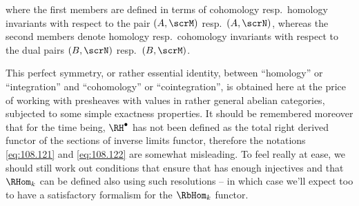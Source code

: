 where the first members are defined in terms of cohomology resp.\
homology invariants with respect to the pair $(A,\scrM)$ resp.\
$(A,\scrN)$, whereas the second members denote homology resp.\
cohomology invariants with respect to the dual pairs $(B,\scrN)$
resp.\ $(B,\scrM)$.
\begin{remarks}
  This perfect symmetry, or rather essential identity, between
  ``homology'' or ``integration'' and ``cohomology'' or
  ``cointegration'', is obtained here at the price of working with
  presheaves with values in rather general abelian categories,
  subjected to some simple exactness properties. It should be
  remembered moreover that for the time being, $\RH^\bullet$ has not
  been defined as the total right derived functor of the sections of
  inverse limits functor, therefore the notations \eqref{eq:108.121}
  and \eqref{eq:108.122} are somewhat misleading. To feel really at
  ease, we should still work out conditions that ensure that \AhatM{}
  has enough injectives and that $\RHom_k$ can be defined also using
  such resolutions -- in which case we'll expect too to have a
  satisfactory formalism for the $\RbHom_k$ functor.
\end{remarks}

\bigbreak
\noindent\hfill{}\par

